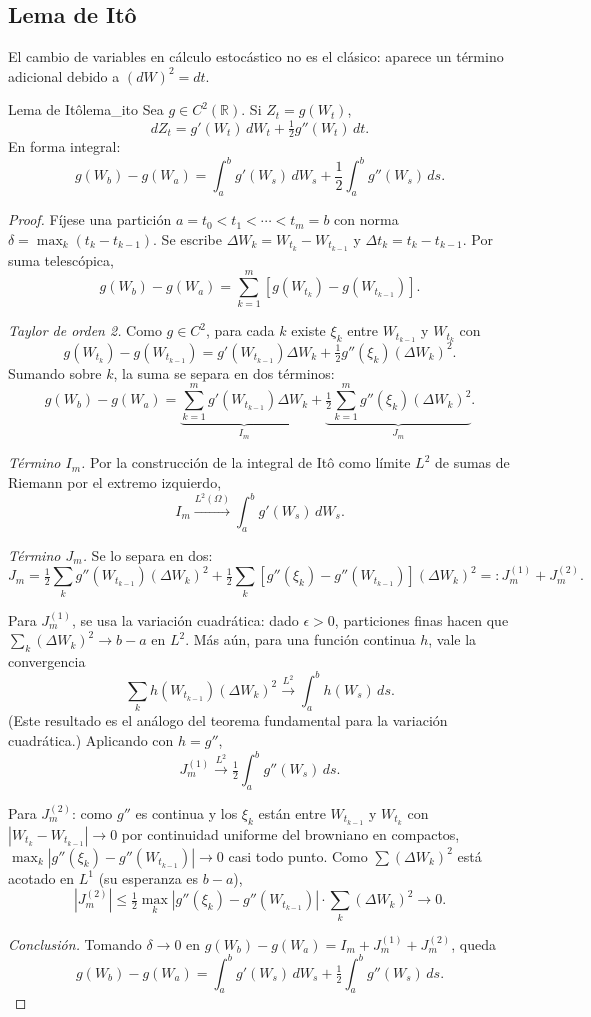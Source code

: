 \documentclass[11pt, a4paper]{article}
\begin{document}
\subsection{Lema de Itô}

El cambio de variables en cálculo estocástico no es el clásico: aparece un término
adicional debido a $(dW)^2 = dt$.

\begin{teorema}{Lema de Itô}{lema_ito}
Sea $g \in C^2(\mathbb{R})$. Si $Z_t = g(W_t)$,
$$ dZ_t = g'(W_t) \, dW_t + \tfrac{1}{2} g''(W_t) \, dt. $$
En forma integral:
$$ g(W_b) - g(W_a) = \int_a^b g'(W_s) \, dW_s + \frac{1}{2} \int_a^b g''(W_s) \, ds. $$
\end{teorema}

\begin{proof}
Fíjese una partición $a = t_0 < t_1 < \cdots < t_m = b$ con norma $\delta = \max_k (t_k -
t_{k-1})$. Se escribe $\Delta W_k = W_{t_k} - W_{t_{k-1}}$ y $\Delta t_k = t_k - t_{k-1}$.
Por suma telescópica,
$$ g(W_b) - g(W_a) = \sum_{k=1}^m [g(W_{t_k}) - g(W_{t_{k-1}})]. $$

\textit{Taylor de orden 2.} Como $g \in C^2$, para cada $k$ existe $\xi_k$ entre $W_{t_{k-1}}$ y
$W_{t_k}$ con
$$ g(W_{t_k}) - g(W_{t_{k-1}}) = g'(W_{t_{k-1}}) \Delta W_k + \tfrac{1}{2} g''(\xi_k) (\Delta
W_k)^2. $$
Sumando sobre $k$, la suma se separa en dos términos:
$$ g(W_b) - g(W_a) = \underbrace{\sum_{k=1}^m g'(W_{t_{k-1}}) \Delta W_k}_{I_m} +
\underbrace{\tfrac{1}{2} \sum_{k=1}^m g''(\xi_k) (\Delta W_k)^2}_{J_m}. $$

\textit{Término $I_m$.} Por la construcción de la integral de Itô como límite $L^2$ de
sumas de Riemann por el extremo izquierdo,
$$ I_m \xrightarrow{L^2(\Omega)}{} \int_a^b g'(W_s) \, dW_s. $$

\textit{Término $J_m$.} Se lo separa en dos:
$$ J_m = \tfrac{1}{2} \sum_k g''(W_{t_{k-1}}) (\Delta W_k)^2 + \tfrac{1}{2} \sum_k [g''(\xi_k) -
g''(W_{t_{k-1}})] (\Delta W_k)^2 =: J_m^{(1)} + J_m^{(2)}. $$

Para $J_m^{(1)}$, se usa la variación cuadrática: dado $\epsilon > 0$, particiones finas hacen
que $\sum_k (\Delta W_k)^2 \to b - a$ en $L^2$. Más aún, para una función continua
$h$, vale la convergencia
$$ \sum_k h(W_{t_{k-1}}) (\Delta W_k)^2 \xrightarrow{L^2}{} \int_a^b h(W_s) \, ds. $$
(Este resultado es el análogo del teorema fundamental para la variación cuadrática.)
Aplicando con $h = g''$,
$$ J_m^{(1)} \xrightarrow{L^2}{} \tfrac{1}{2} \int_a^b g''(W_s) \, ds. $$

Para $J_m^{(2)}$: como $g''$ es continua y los $\xi_k$ están entre $W_{t_{k-1}}$ y $W_{t_k}$ con
$|W_{t_k} - W_{t_{k-1}}| \to 0$ por continuidad uniforme del browniano en compactos,
$\max_k |g''(\xi_k) - g''(W_{t_{k-1}})| \to 0$ casi todo punto. Como $\sum (\Delta W_k)^2$ está
acotado en $L^1$ (su esperanza es $b - a$),
$$ |J_m^{(2)}| \le \tfrac{1}{2} \max_k |g''(\xi_k) - g''(W_{t_{k-1}})| \cdot \sum_k (\Delta W_k)^2
\xrightarrow{}{} 0. $$

\textit{Conclusión.} Tomando $\delta \to 0$ en
$g(W_b) - g(W_a) = I_m + J_m^{(1)} + J_m^{(2)}$, queda
$$ g(W_b) - g(W_a) = \int_a^b g'(W_s) \, dW_s + \tfrac{1}{2} \int_a^b g''(W_s) \, ds. $$
\end{proof}
\end{document}

